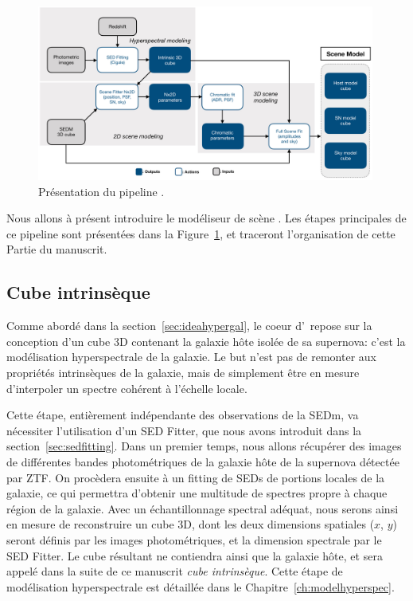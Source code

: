 \documentclass[../main/main.tex]{subfiles}
\begin{document}
\begin{figure}
  \centering
  \includegraphics[width=0.99\textwidth]{../figures/04_hypergal/softdaghypergal.pdf}
  \caption[Présentation du pipeline \hypergal]{Présentation du pipeline \hypergal.}
  \label{fig:softdaghypergal}
\end{figure}

Nous allons à présent introduire le modéliseur de scène \hypergal.
Les étapes principales de ce pipeline sont présentées dans la
Figure~\ref{fig:softdaghypergal}, et traceront l'organisation de cette
Partie du manuscrit.

\subsection{Cube intrinsèque}

Comme abordé dans la section~\ref{sec:ideahypergal}, le coeur
d'\hypergal\ repose sur la conception d'un cube 3D contenant la galaxie
hôte isolée de sa supernova: c'est la modélisation hyperspectrale de la galaxie. Le but n'est pas de remonter aux propriétés
intrinsèques de la galaxie, mais de simplement être en mesure
d'interpoler un spectre cohérent à l'échelle locale.

Cette étape, entièrement indépendante des observations de la
SEDm, va nécessiter l'utilisation d'un SED Fitter, que nous avons
introduit dans la section~\ref{sec:sedfitting}. Dans un premier temps,
nous allons 
récupérer des images de différentes bandes photométriques de la galaxie hôte de la supernova
détectée par ZTF. On procèdera ensuite à un fitting de SEDs de portions
locales de la galaxie, ce qui permettra d'obtenir une multitude de
spectres propre à chaque région de la galaxie. Avec un échantillonnage spectral
adéquat, nous serons ainsi en mesure de reconstruire un cube 3D, dont
les deux dimensions spatiales ($x$, $y$) seront définis par les images
photométriques, et la dimension spectrale par le SED Fitter. Le cube
résultant ne contiendra ainsi que la galaxie hôte, et sera appelé dans
la suite de ce manuscrit \textit{cube intrinsèque}. Cette étape de
modélisation hyperspectrale est détaillée dans le Chapitre~\ref{ch:modelhyperspec}.
\end{document}
